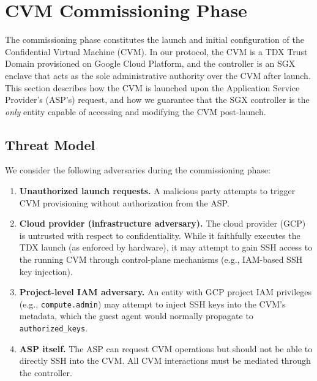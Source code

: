 % 
%   
%

\section{CVM Commissioning Phase}
\label{sec:commissioning}

The commissioning phase constitutes the launch and initial configuration of the Confidential Virtual Machine (CVM). In our protocol, the CVM is a TDX Trust Domain provisioned on Google Cloud Platform, and the controller is an SGX enclave that acts as the sole administrative authority over the CVM after launch. This section describes how the CVM is launched upon the Application Service Provider's (ASP's) request, and how we guarantee that the SGX controller is the \emph{only} entity capable of accessing and modifying the CVM post-launch.

\subsection{Threat Model}
\label{sec:commissioning:threat}

We consider the following adversaries during the commissioning phase:

\begin{enumerate}
    \item \textbf{Unauthorized launch requests.} A malicious party attempts to trigger CVM provisioning without authorization from the ASP.
    \item \textbf{Cloud provider (infrastructure adversary).} The cloud provider (GCP) is untrusted with respect to confidentiality. While it faithfully executes the TDX launch (as enforced by hardware), it may attempt to gain SSH access to the running CVM through control-plane mechanisms (e.g., IAM-based SSH key injection).
    \item \textbf{Project-level IAM adversary.} An entity with GCP project IAM privileges (e.g., \texttt{compute.admin}) may attempt to inject SSH keys into the CVM's metadata, which the guest agent would normally propagate to \texttt{authorized\_keys}.
    \item \textbf{ASP itself.} The ASP can request CVM operations but should not be able to directly SSH into the CVM. All CVM interactions must be mediated through the controller.
\end{enumerate}


